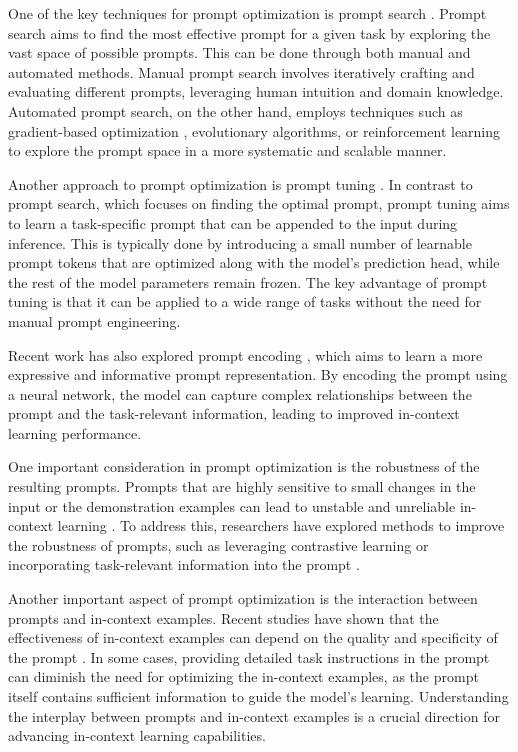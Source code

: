 \documentclass[11pt]{article}
\begin{document}
One of the key techniques for prompt optimization is prompt search \cite{ref63}. Prompt search aims to find the most effective prompt for a given task by exploring the vast space of possible prompts. This can be done through both manual and automated methods. Manual prompt search involves iteratively crafting and evaluating different prompts, leveraging human intuition and domain knowledge. Automated prompt search, on the other hand, employs techniques such as gradient-based optimization \cite{ref64}, evolutionary algorithms, or reinforcement learning \cite{ref64} to explore the prompt space in a more systematic and scalable manner.

Another approach to prompt optimization is prompt tuning \cite{ref65,ref66}. In contrast to prompt search, which focuses on finding the optimal prompt, prompt tuning aims to learn a task-specific prompt that can be appended to the input during inference. This is typically done by introducing a small number of learnable prompt tokens that are optimized along with the model's prediction head, while the rest of the model parameters remain frozen. The key advantage of prompt tuning is that it can be applied to a wide range of tasks without the need for manual prompt engineering.

Recent work has also explored prompt encoding \cite{ref67}, which aims to learn a more expressive and informative prompt representation. By encoding the prompt using a neural network, the model can capture complex relationships between the prompt and the task-relevant information, leading to improved in-context learning performance.

One important consideration in prompt optimization is the robustness of the resulting prompts. Prompts that are highly sensitive to small changes in the input or the demonstration examples can lead to unstable and unreliable in-context learning \cite{ref63}. To address this, researchers have explored methods to improve the robustness of prompts, such as leveraging contrastive learning \cite{ref68,ref69} or incorporating task-relevant information into the prompt \cite{ref65,ref70}.

Another important aspect of prompt optimization is the interaction between prompts and in-context examples. Recent studies have shown that the effectiveness of in-context examples can depend on the quality and specificity of the prompt \cite{ref71}. In some cases, providing detailed task instructions in the prompt can diminish the need for optimizing the in-context examples, as the prompt itself contains sufficient information to guide the model's learning. Understanding the interplay between prompts and in-context examples is a crucial direction for advancing in-context learning capabilities.
\end{document}
